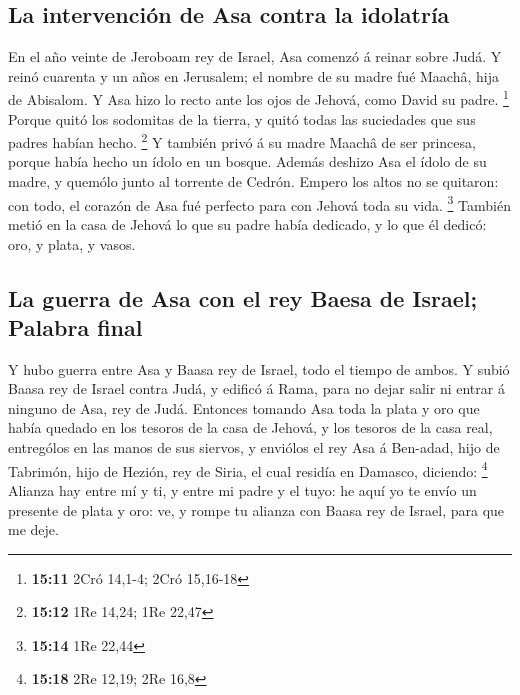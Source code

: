 \hypertarget{la-intervenciuxf3n-de-asa-contra-la-idolatruxeda}{%
\subsection{La intervención de Asa contra la
idolatría}\label{la-intervenciuxf3n-de-asa-contra-la-idolatruxeda}}

 En el año veinte de Jeroboam rey de Israel, Asa comenzó á
reinar sobre Judá.  Y reinó cuarenta y un años en
Jerusalem; el nombre de su madre fué Maachâ, hija de Abisalom.
 Y Asa hizo lo recto ante los ojos de Jehová, como David su
padre. \footnote{\textbf{15:11} 2Cró 14,1-4; 2Cró 15,16-18}
 Porque quitó los sodomitas de la tierra, y quitó todas las
suciedades que sus padres habían hecho. \footnote{\textbf{15:12} 1Re
  14,24; 1Re 22,47}  Y también privó á su madre Maachâ de
ser princesa, porque había hecho un ídolo en un bosque. Además deshizo
Asa el ídolo de su madre, y quemólo junto al torrente de Cedrón.
 Empero los altos no se quitaron: con todo, el corazón de
Asa fué perfecto para con Jehová toda su vida. \footnote{\textbf{15:14}
  1Re 22,44}  También metió en la casa de Jehová lo que su
padre había dedicado, y lo que él dedicó: oro, y plata, y vasos.

\hypertarget{la-guerra-de-asa-con-el-rey-baesa-de-israel-palabra-final}{%
\subsection{La guerra de Asa con el rey Baesa de Israel; Palabra
final}\label{la-guerra-de-asa-con-el-rey-baesa-de-israel-palabra-final}}

 Y hubo guerra entre Asa y Baasa rey de Israel, todo el
tiempo de ambos.  Y subió Baasa rey de Israel contra Judá,
y edificó á Rama, para no dejar salir ni entrar á ninguno de Asa, rey de
Judá.  Entonces tomando Asa toda la plata y oro que había
quedado en los tesoros de la casa de Jehová, y los tesoros de la casa
real, entrególos en las manos de sus siervos, y enviólos el rey Asa á
Ben-adad, hijo de Tabrimón, hijo de Hezión, rey de Siria, el cual
residía en Damasco, diciendo: \footnote{\textbf{15:18} 2Re 12,19; 2Re
  16,8}  Alianza hay entre mí y ti, y entre mi padre y el
tuyo: he aquí yo te envío un presente de plata y oro: ve, y rompe tu
alianza con Baasa rey de Israel, para que me deje.

